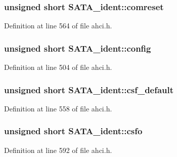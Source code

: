 \subsubsection[{\texorpdfstring{comreset}{comreset}}]{\setlength{\rightskip}{0pt plus 5cm}unsigned short S\+A\+T\+A\+\_\+ident\+::comreset}\hypertarget{structSATA__ident_a6498b61fb0529b5e774dd2f633ea5fe6}{}\label{structSATA__ident_a6498b61fb0529b5e774dd2f633ea5fe6}


Definition at line 564 of file ahci.\+h.

\subsubsection[{\texorpdfstring{config}{config}}]{\setlength{\rightskip}{0pt plus 5cm}unsigned short S\+A\+T\+A\+\_\+ident\+::config}\hypertarget{structSATA__ident_a3e2eb6859b4845ab26956b03933e8774}{}\label{structSATA__ident_a3e2eb6859b4845ab26956b03933e8774}


Definition at line 504 of file ahci.\+h.

\subsubsection[{\texorpdfstring{csf\+\_\+default}{csf_default}}]{\setlength{\rightskip}{0pt plus 5cm}unsigned short S\+A\+T\+A\+\_\+ident\+::csf\+\_\+default}\hypertarget{structSATA__ident_ab29fc72ea1317ab5f5d06d59ab7b84ff}{}\label{structSATA__ident_ab29fc72ea1317ab5f5d06d59ab7b84ff}


Definition at line 558 of file ahci.\+h.

\subsubsection[{\texorpdfstring{csfo}{csfo}}]{\setlength{\rightskip}{0pt plus 5cm}unsigned short S\+A\+T\+A\+\_\+ident\+::csfo}\hypertarget{structSATA__ident_a1ccb2068f8fe097ee7055f214b1f8416}{}\label{structSATA__ident_a1ccb2068f8fe097ee7055f214b1f8416}


Definition at line 592 of file ahci.\+h.

